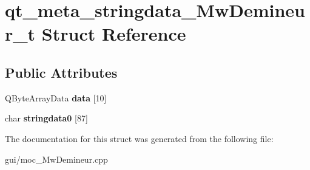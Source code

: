 \hypertarget{structqt__meta__stringdata___mw_demineur__t}{}\section{qt\+\_\+meta\+\_\+stringdata\+\_\+\+Mw\+Demineur\+\_\+t Struct Reference}
\label{structqt__meta__stringdata___mw_demineur__t}
\subsection*{Public Attributes}
\begin{DoxyCompactItemize}
\item 
\mbox{\label{structqt__meta__stringdata___mw_demineur__t_a2ff2020b87d904f91ada9be2d3d2cf7a}} 
Q\+Byte\+Array\+Data {\bfseries data} \mbox{[}10\mbox{]}
\item 
\mbox{\label{structqt__meta__stringdata___mw_demineur__t_a02386a659af33b2c248e41942adde76c}} 
char {\bfseries stringdata0} \mbox{[}87\mbox{]}
\end{DoxyCompactItemize}


The documentation for this struct was generated from the following file\+:\begin{DoxyCompactItemize}
\item 
gui/moc\+\_\+\+Mw\+Demineur.\+cpp\end{DoxyCompactItemize}
